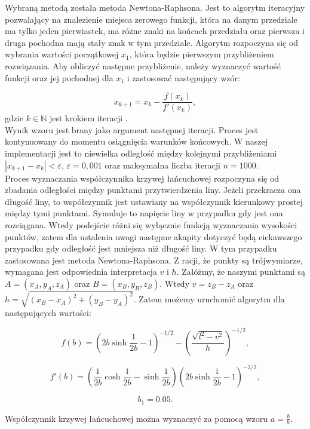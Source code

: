 Wybraną metodą została metoda Newtona-Raphsona. Jest to algorytm iteracyjny pozwalający na znalezienie miejsca zerowego funkcji, która na danym przedziale ma tylko jeden pierwiastek, ma różne znaki na końcach przedziału oraz pierwsza i druga pochodna mają stały znak w tym przedziale. Algorytm rozpoczyna się od wybrania wartości początkowej $x_1$, która będzie pierwszym przybliżeniem rozwiązania. Aby obliczyć następne przybliżenie, należy wyznaczyć wartość funkcji oraz jej pochodnej dla $x_1$ i zastosować następujący wzór:

\begin{equation}
	x_{k+1} = x_k - \frac{f(x_k)}{f'(x_k)},
\end{equation}
gdzie $k \in \mathbb{N}$ jest krokiem iteracji .
\\

Wynik wzoru jest brany jako argument następnej iteracji. Proces jest kontynuowany do momentu osiągnięcia warunków końcowych. W naszej implementacji jest to niewielka odległość między kolejnymi przybliżeniami $ | x_{k+1} - x_k | < \varepsilon$, $\varepsilon = 0,001$ oraz maksymalna liczba iteracji $n=1000$.
\\

Proces wyznaczania współczynnika krzywej łańcuchowej rozpoczyna się od zbadania odległości między punktami przytwierdzenia liny. Jeżeli przekracza ona długość liny, to współczynnik jest ustawiany na współczynnik kierunkowy prostej między tymi punktami. Symuluje to napięcie liny w przypadku gdy jest ona rozciągana. Wtedy podejście różni się wyłącznie funkcją wyznaczania wysokości punktów, zatem dla ustalenia uwagi następne akapity dotyczyć będą ciekawszego przypadku gdy odległość jest mniejsza niż długość liny. W tym przypadku zastosowana jest metoda Newtona-Raphsona. Z racji, że punkty są trójwymiarze, wymagana jest odpowiednia interpretacja $v$ i $h$. Załóżmy, że naszymi punktami są $A = (x_A, y_A, z_A)$ oraz $B= (x_B, y_B, z_B)$. Wtedy $v = z_B - z_A$ oraz $ h = \sqrt{(x_B - x_A)^2 + (y_B - y_A)^2}$. Zatem możemy uruchomić algorytm dla następujących wartości:

$$
	f(b) = \left( 2b\sinh\frac{1}{2b} - 1 \right)^{-1/2} - \left( \frac{\sqrt{l^2 - v^2}}{h} \right)^{-1/2},
$$

$$
	f'(b) = \left( \frac{1}{2b} \cosh \frac{1}{2b} - \sinh \frac{1}{2b} \right) \left( 2b \sinh \frac{1}{2b} - 1 \right) ^ {-3/2},
$$

$$
b_1 = 0.05. 
$$

Współczynnik krzywej łańcuchowej można wyznaczyć za pomocą wzoru $a = \frac{b}{h}$.
\\

